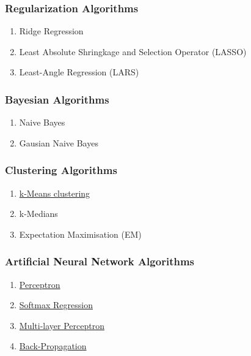 \hypertarget{regularization-algorithms}{\subsubsection{Regularization
Algorithms}\label{regularization-algorithms}}

\begin{enumerate}
\def\labelenumi{\arabic{enumi}.}
\tightlist
\item
  Ridge Regression
\item
  Least Absolute Shringkage and Selection Operator (LASSO)
\item
  Least-Angle Regression (LARS)
\end{enumerate}

\hypertarget{bayesian-algorithms}{\subsubsection{Bayesian
Algorithms}\label{bayesian-algorithms}}

\begin{enumerate}
\def\labelenumi{\arabic{enumi}.}
\tightlist
\item
  Naive Bayes
\item
  Gausian Naive Bayes
\end{enumerate}

\hypertarget{clustering-algorithms}{\subsubsection{Clustering
Algorithms}\label{clustering-algorithms}}

\begin{enumerate}
\def\labelenumi{\arabic{enumi}.}
\tightlist
\item
  \href{/2017/01/01/kmeans/}{k-Means clustering}
\item
  k-Medians
\item
  Expectation Maximisation (EM)
\end{enumerate}

\hypertarget{artificial-neural-network-algorithms}{\subsubsection{Artificial
Neural Network Algorithms}\label{artificial-neural-network-algorithms}}

\begin{enumerate}
\def\labelenumi{\arabic{enumi}.}
\tightlist
\item
  \href{/2017/01/21/perceptron/}{Perceptron}
\item
  \href{/2017/02/17/softmax/}{Softmax Regression}
\item
  \href{/2017/02/24/mlp/}{Multi-layer Perceptron}
\item
  \href{/2017/02/24/mlp/\#-backpropagation}{Back-Propagation}
\end{enumerate}

